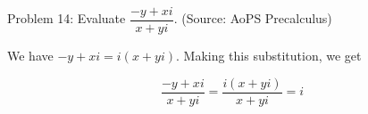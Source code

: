Problem 14: Evaluate $\dfrac{-y + xi}{x + yi}$. (Source: AoPS Precalculus)

We have $-y + xi = i(x + yi)$. Making this substitution, we get

$$ \frac{-y + xi}{x + yi} = \frac{i(x + yi)}{x + yi} = \boxed{i}$$
